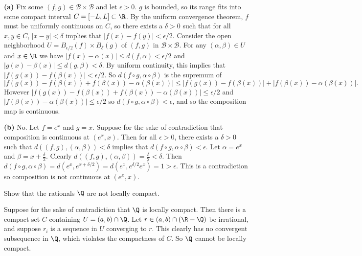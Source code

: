 \documentclass[11pt,letterpaper]{article}
\begin{document}
\begin{solution}
    \textbf{(a)} Fix some $(f,g)\in \mathcal{B} \times \mathcal{B}$ and let $\epsilon>0$. $g$ is bounded, so its range fits into some compact interval $C=[-L,L]\subset \R$. By the uniform convergence theorem, $f$ must be uniformly continuous on $C$, so there exists a $\delta>0$ such that for all $x,y \in C$, $|x-y|<\delta$ implies that $|f(x)-f(y)|<\epsilon /2$. Consider the open neighborhood $U=B_{\epsilon /2}(f)\times B_{\delta}(g)$ of $(f,g)$ in $\mathcal{B} \times \mathcal{B}$. For any $(\alpha,\beta)\in U$ and $x\in \R$ we have $|f(x)-\alpha(x)|\leq d(f,\alpha) < \epsilon /2$ and $|g(x)-\beta(x)|\leq d(g,\beta)<\delta$. By uniform continuity, this implies that $|f(g(x))-f(\beta(x))|<\epsilon /2$. So $d(f\circ g, \alpha\circ \beta)$ is the supremum of 
    \[
        |f(g(x))-f(\beta(x))+f(\beta(x))-\alpha(\beta(x))| \leq |f(g(x))-f(\beta(x))|+|f(\beta(x))-\alpha(\beta(x))|
    .\]
     However $|f(g(x))-f(\beta(x))+f(\beta(x))-\alpha(\beta(x))|\leq \epsilon /2$ and $|f(\beta(x))-\alpha(\beta(x))|\leq \epsilon /2$ so $d(f\circ g, \alpha\circ\beta)<\epsilon$, and so the composition map is continuous.
     
     \textbf{(b)} No. Let $f=e^x$ and $g=x$. Suppose for the sake of contradiction that composition is continuous at $(e^x, x)$. Then for all $\epsilon > 0$, there exists a $\delta > 0$ such that $d((f,g), (\alpha, \beta))<\delta$ implies that $d(f\circ g, \alpha\circ \beta)<\epsilon$. Let $\alpha=e^x$ and $\beta = x+\frac{\delta}{2}$. Clearly $d((f,g), (\alpha,\beta))=\frac{\delta}{2}<\delta$. Then $d(f\circ g, \alpha\circ \beta)=d(e^x, e^{x+\delta /2})=d(e^x, e^{\delta /2}e^x)=1>\epsilon$. This is a contradiction so composition is not continuous at $(e^x,x)$.      
\end{solution}

\begin{problem}
    Show that the rationals $\Q$ are not locally compact.
\end{problem}

\begin{solution}
    Suppose for the sake of contradiction that $\Q$ is locally compact. Then there is a compact set $C$ containing $U=(a,b)\cap \Q$. Let $r\in (a,b)\cap (\R - \Q)$ be irrational, and suppose $r_i$ is a sequence in $U$ converging to $r$. This clearly has no convergent subsequence in $\Q$, which violates the compactness of $C$. So $\Q$ cannot be locally compact. 
\end{solution}
\end{document}
